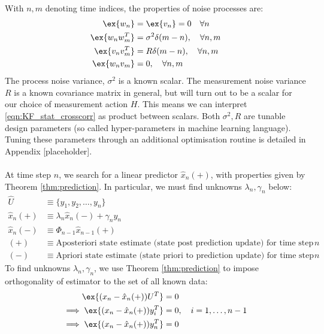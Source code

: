\\
\\
With $n,m$ denoting time indices, the properties of noise processes are:
\begin{align}
\ex{w_n} & = \ex{v_n}= 0 \quad \forall n \label{eqn:KF_stat_noisemean}\\
\ex{w_nw_m^T} &= \sigma^2 \delta(m-n),  \quad \forall n,m \label{eqn:KF_stat_noisepros}\\
\ex{v_n v_m^T}&= R\delta(m-n), \quad  \forall n,m  \label{eqn:KF_stat_noisemsmt} \\
\ex{w_n v_m} &= 0,  \quad \forall n,m \label{eqn:KF_stat_crosscorr}
\end{align} 
The process noise variance, $\sigma^2$ is a known scalar. The measurement noise variance $R$ is a known covariance matrix in general, but will turn out to be a scalar for our choice of measurement action $H$. This means we can interpret \ref{eqn:KF_stat_crosscorr} as product between scalars. Both $\sigma^2, R$ are tunable design parameters (so called hyper-parameters in machine learning language). Tuning these parameters through an additional optimisation routine is detailed in Appendix [placeholder]. 
\\
\\
At time step $n$, we search for a linear predictor $\hat{x}_n(+)$, with properties given by Theorem \ref{thm:prediction}. In particular, we must find unknowns $\lambda_n, \gamma_n$ below:
\begin{align}
\hat{U} & \equiv \{y_1, y_2,\dots, y_n\} \\
\hat{x}_n(+) & \equiv \lambda_n \hat{x}_n(-) + \gamma_n y_n \label{eqn:KF_predictor}\\
\hat{x}_n(-) & \equiv \Phi_{n-1} \hat{x}_{n-1}(+) \\
(+) &\equiv \text{Aposteriori state estimate  (state post prediction update) for time step $n$}\\
(-) &\equiv \text{Apriori state estimate (state priori to prediction update) for time step $n$}
\end{align}
To find unknowns $\lambda_n, \gamma_n$, we use Theorem \ref{thm:prediction} to impose orthogonality of estimator to the set of all known data:
\begin{align}
\ex{(x_n - \hat{x}_n(+))U^T} &= 0 \label{eqn:KF_reln_1}\\
\implies \ex{(x_n - \hat{x}_n(+))y_i^T} &= 0, \quad i = 1,\dots, n-1 \label{eqn:KF_reln_2}\\
\implies \ex{(x_n - \hat{x}_n(+))y_n^T} &= 0 \label{eqn:KF_reln_3}
\end{align}
